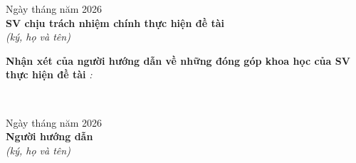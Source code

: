 {%
\begin{flushright}
    Ngày \underline{\quad} tháng \underline{\quad} năm 2026 \\[0.3cm]
    \textbf{SV chịu trách nhiệm chính thực hiện đề tài} \\[0.15cm]
    \textit{(ký, họ và tên)} \\[1.8cm]
\end{flushright}

\vspace{0.1cm}
\noindent\textbf{Nhận xét của người hướng dẫn về những đóng góp khoa học của SV thực hiện đề tài}
\textit{:}

\vspace{0.2cm}
\noindent\dotfill\\[0.55cm]
\noindent\dotfill

\vspace{0.5cm}
\begin{flushright}
    Ngày \underline{\quad} tháng \underline{\quad} năm 2026 \\[0.3cm]
    \textbf{Người hướng dẫn} \\[0.15cm]
    \textit{(ký, họ và tên)} \\[1.8cm]
\end{flushright}

}